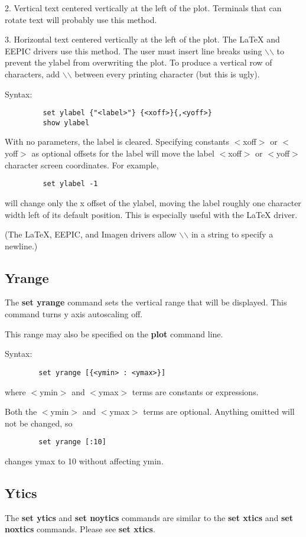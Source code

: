 2. Vertical text centered vertically at the left of the plot.
Terminals that can rotate text will probably use this method.

3. Horizontal text centered vertically at the left of the plot.
The LaTeX and EEPIC drivers use this method. The user must insert 
line breaks using $\backslash$$\backslash$ to prevent the ylabel from overwriting
the plot. To produce a vertical row of characters, add $\backslash$$\backslash$
between every printing character (but this is ugly).

Syntax:  
\begin{verbatim}
         set ylabel {"<label>"} {<xoff>}{,<yoff>}
         show ylabel
\end{verbatim}

With no parameters, the label is cleared. Specifying constants $<$xoff$>$
or $<$yoff$>$ as optional offsets for the label will move the label $<$xoff$>$
or $<$yoff$>$ character screen coordinates. For example,

\begin{verbatim}
         set ylabel -1
\end{verbatim}

will change only the x offset of the ylabel, moving the label roughly
one character width left of its default position. This is especially
useful with the LaTeX driver.

(The LaTeX, EEPIC, and Imagen drivers allow $\backslash$$\backslash$ in a string to specify
a newline.)
\subsection{Yrange}
The {\bf set yrange} command sets the vertical range that will be
displayed. This command turns y axis autoscaling off.

This range may also be specified on the {\bf plot} command line.

Syntax:
\begin{verbatim}
        set yrange [{<ymin> : <ymax>}]
\end{verbatim}

where $<$ymin$>$ and $<$ymax$>$ terms are constants or expressions.

Both the $<$ymin$>$ and $<$ymax$>$ terms are optional. Anything omitted will
not be changed, so 
\begin{verbatim}
        set yrange [:10]
\end{verbatim}
changes ymax to 10 without affecting ymin.
\subsection{Ytics}
The {\bf set ytics} and {\bf set noytics} commands are similar to the {\bf set xtics}
and {\bf set noxtics} commands. Please see {\bf set xtics}.
